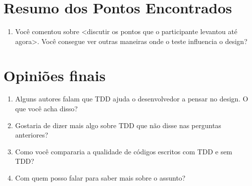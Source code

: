 \section{Resumo dos Pontos Encontrados}

\begin{enumerate}
	\item Você comentou sobre <discutir os pontos que o participante levantou até agora>. Você
	consegue ver outras maneiras onde o teste influencia o design?
\end{enumerate}

\section{Opiniões finais}

\begin{enumerate}
	\item Alguns autores falam que TDD ajuda o desenvolvedor a pensar no design. O que você acha disso?

	\item Gostaria de dizer mais algo sobre TDD que não disse nas perguntas anteriores?
	
	\item Como você compararia a qualidade de códigos escritos com TDD e sem TDD? 

	\item Com quem posso falar para saber mais sobre o assunto?
\end{enumerate}
